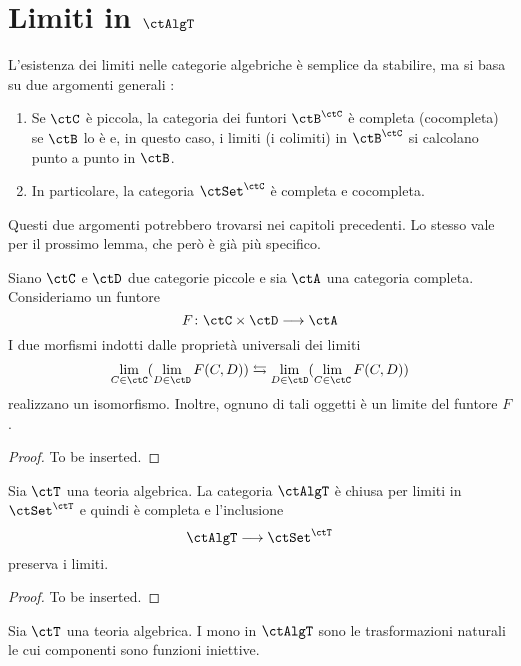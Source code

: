 \section{Limiti in $\ctAlgT$}\label{sec_lim_AlgT}

\begin{warning}\label{caveat_lim_functcat}
L'esistenza dei limiti nelle categorie algebriche è semplice da stabilire, ma si basa su due argomenti generali :
\begin{enumerate}
\item Se $\ctC$ è piccola, la categoria dei funtori $\ctB^{\ctC}$ è completa (cocompleta) se $\ctB$ lo è e, in questo caso, i limiti (i
colimiti) in $\ctB^{\ctC}$ si calcolano punto a punto in $\ctB$.
\item In particolare, la categoria $\ctSet^{\ctC}$ è completa e cocompleta.
\end{enumerate}
Questi due argomenti potrebbero trovarsi nei capitoli precedenti. Lo stesso vale per il prossimo lemma, che però è già più specifico.
\end{warning} 

\begin{lemma}\label{lemma_Fubini}
Siano $\ctC$ e $\ctD$ due categorie piccole e sia $\ctA$ una categoria completa. Consideriamo un funtore
\[
  F \colon \ctC \times \ctD \fun \ctA 
\]
I due morfismi indotti dalle proprietà universali dei limiti
\[
  \lim_{C \in \ctC}(\lim_{D \in \ctD}F(C,D)) \leftrightarrows \lim_{D \in \ctD}(\lim_{C \in \ctC}F(C,D)) 
\]
realizzano un isomorfismo. Inoltre, ognuno di tali oggetti è un limite del funtore $F$.
\end{lemma}

\begin{proof}
To be inserted.
\end{proof}

\begin{proposition}\label{prop_lim_AlgT}
Sia $\ctT$ una teoria algebrica. La categoria $\ctAlgT$ è chiusa per limiti in $\ctSet^{\ctT}$ e quindi è completa e l'inclusione
\[
  \ctAlgT \fun \ctSet^{\ctT} 
\]
preserva i limiti.
\end{proposition}

\begin{proof}
To be inserted.
\end{proof}

\begin{corollary}\label{cor_mono_AlgT}
Sia $\ctT$ una teoria algebrica. I mono in $\ctAlgT$ sono le trasformazioni naturali le cui componenti sono funzioni iniettive.
\end{corollary}


